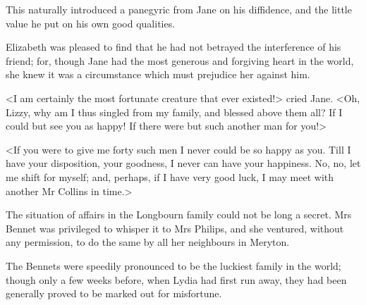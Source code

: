 This naturally introduced a panegyric from Jane on his diffidence, and the little value he put on his own good qualities.

Elizabeth was pleased to find that he had not betrayed the interference of his friend; for, though Jane had the most generous and forgiving heart in the world, she knew it was a circumstance which must prejudice her against him.

<I am certainly the most fortunate creature that ever existed!> cried Jane. <Oh, Lizzy, why am I thus singled from my family, and blessed above them all? If I could but see you as happy! If there were but such another man for you!>

<If you were to give me forty such men I never could be so happy as you. Till I have your disposition, your goodness, I never can have your happiness. No, no, let me shift for myself; and, perhaps, if I have very good luck, I may meet with another Mr Collins in time.>

The situation of affairs in the Longbourn family could not be long a secret. Mrs Bennet was privileged to whisper it to Mrs Philips, and she ventured, without any permission, to do the same by all her neighbours in Meryton.

The Bennets were speedily pronounced to be the luckiest family in the world; though only a few weeks before, when Lydia had first run away, they had been generally proved to be marked out for misfortune.
